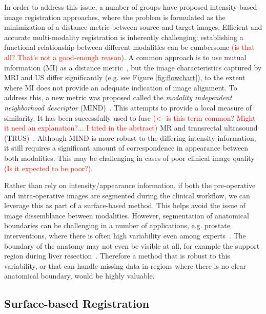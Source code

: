 \documentclass[journal]{IEEEtran}
\newcommand{\comment}[1]{\textcolor{red}{#1}}
\begin{document}
In order to address this issue, a number of groups have proposed intensity-based image registration approaches, where the problem is formulated as the minimization of a distance metric between source and target images.  Efficient and accurate multi-modality registration is inherently challenging: establishing a functional relationship between different modalities can be cumbersome \comment{(is that all? That's not a good-enough reason)}. A common approach is to use mutual information (MI) as a distance metric~\cite{Wells96a}, but the image characteristics captured by MRI and US differ significantly (e.g. see Figure \ref{fig:flowchart}), to the extent where MI does not provide an adequate indication of image alignment. To address this, a new metric was proposed called the \textit{modality independent neighborhood descriptor} (MIND)~\cite{Heinrich12a}.  This attempts to provide a local measure of similarity.  It has been successfully used to fuse \comment{(<- is this term common?  Might it need an explanation?... I tried in the abstract)} MR and transrectal ultrasound (TRUS)~\cite{Sun13a}. Although MIND is more robust to the differing intensity information, it still requires a significant amount of correspondence in appearance between both modalities. This may be challenging in cases of poor clinical image quality \comment{(Is it expected to be poor?)}. 

Rather than rely on intensity/appearance information, if both the pre-operative and intra-operative images are segmented during the clinical workflow, we can leverage this as part of a surface-based method.  This helps avoid the issue of image dissemblance between modalities.  However, segmentation of anatomical boundaries can be challenging in a number of applications, e.g. prostate interventions, where there is often high variability even among experts~\cite{Smith07a}. The boundary of the anatomy may not even be visible at all, for example the support region during liver resection~\cite{Cash05a,Rucker14a}. Therefore a method that is robust to this variability, or that can handle missing data in regions where there is no clear anatomical boundary, would be highly valuable.

\subsection{Surface-based Registration}
\end{document}
